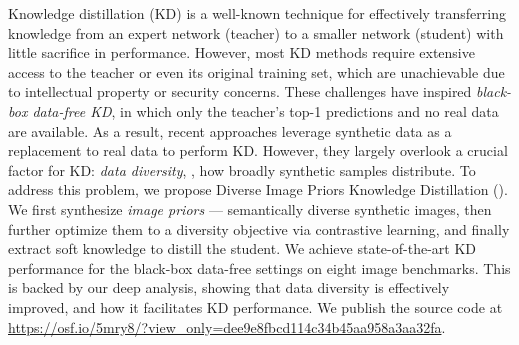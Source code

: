 Knowledge distillation (KD) is a well-known technique for effectively transferring knowledge from an expert network (teacher) to a smaller network (student) with little sacrifice in performance.
However, most KD methods require extensive access to the teacher or even its original training set, which are unachievable due to intellectual property or security concerns.
These challenges have inspired \textit{black-box data-free KD}, in which only the teacher's top-1 predictions and no real data are available.
As a result, recent approaches leverage synthetic data as a replacement to real data to perform KD.
However, they largely overlook a crucial factor for KD: \textit{data diversity}, \ie, how broadly synthetic samples distribute.
To address this problem, we propose Diverse Image Priors Knowledge Distillation ({\methodname}).
We first synthesize \textit{image priors} --- semantically diverse synthetic images, then further optimize them to a diversity objective via contrastive learning, and finally extract soft knowledge to distill the student.
We achieve state-of-the-art KD performance for the black-box data-free settings on eight image benchmarks.
This is backed by our deep analysis, showing that data diversity is effectively improved, and how it facilitates KD performance.
We publish the source code at \url{https://osf.io/5mry8/?view_only=dee9e8fbcd114c34b45aa958a3aa32fa}.
